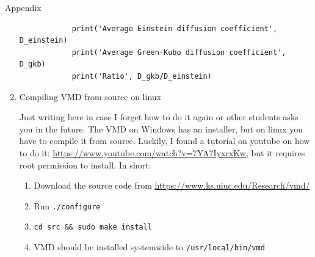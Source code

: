 \documentclass{article}
\begin{document}
\begin{section}{Appendix}
\begin{enumerate}
\begin{verbatim}
            print('Average Einstein diffusion coefficient', D_einstein)
            print('Average Green-Kubo diffusion coefficient', D_gkb)
            print('Ratio', D_gkb/D_einstein)
		\end{verbatim}

	\item Compiling VMD from source on linux
	
	Just writing here in case I forget how to do it again or other students asks you in the future. The VMD on Windows has an installer, but on linux you have to compile it from source. Luckily, I found a tutorial on youtube on how to do it: \url{https://www.youtube.com/watch?v=7YA7IyxrxKw}, but it requires root permission to install. In short:
	\begin{enumerate}
		\item Download the source code from \url{https://www.ks.uiuc.edu/Research/vmd/}
		\item Run \texttt{./configure}
		\item \texttt{cd src \&\& sudo make install}
		\item VMD should be installed systemwide to \texttt{/usr/local/bin/vmd}
	\end{enumerate}
\end{enumerate}
\end{section}
\end{document}

